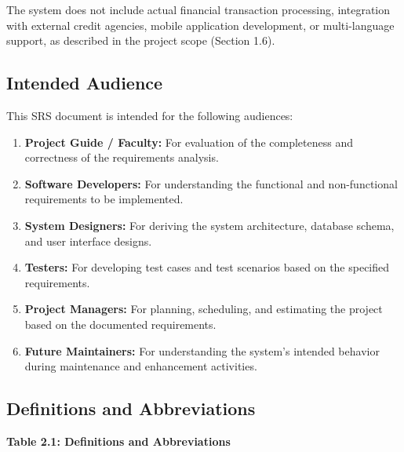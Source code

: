 \documentclass[12pt,a4paper,oneside]{report}
\begin{document}
The system does not include actual financial transaction processing, integration with external credit agencies, mobile application development, or multi-language support, as described in the project scope (Section 1.6).

\subsection{Intended Audience}

This SRS document is intended for the following audiences:

\begin{enumerate}
  \item \textbf{Project Guide / Faculty:} For evaluation of the completeness and correctness of the requirements analysis.
  \item \textbf{Software Developers:} For understanding the functional and non-functional requirements to be implemented.
  \item \textbf{System Designers:} For deriving the system architecture, database schema, and user interface designs.
  \item \textbf{Testers:} For developing test cases and test scenarios based on the specified requirements.
  \item \textbf{Project Managers:} For planning, scheduling, and estimating the project based on the documented requirements.
  \item \textbf{Future Maintainers:} For understanding the system's intended behavior during maintenance and enhancement activities.
\end{enumerate}

\subsection{Definitions and Abbreviations}

\textbf{Table 2.1: Definitions and Abbreviations}
\end{document}
